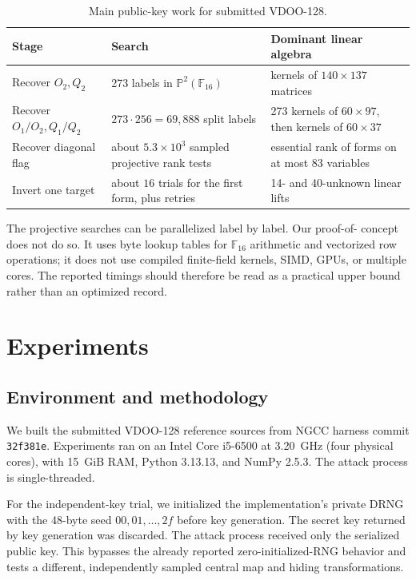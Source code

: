 \documentclass[11pt]{article}
\newcommand{\F}{\mathbb{F}}
\newcommand{\Proj}{\mathbb{P}}
\newcommand{\code}[1]{\texttt{#1}}
\begin{document}
\begin{table}[ht]
\centering
\caption{Main public-key work for submitted VDOO-128.}
\label{tab:work}
\small
\begin{tabular}{@{}p{38mm}p{43mm}p{55mm}@{}}
\toprule
Stage & Search & Dominant linear algebra \\
\midrule
Recover $O_2,Q_2$ & 273 labels in $\Proj^2(\F_{16})$
  & kernels of $140\times137$ matrices \\
Recover $O_1/O_2,Q_1/Q_2$ & $273\cdot256=69{,}888$ split labels
  & 273 kernels of $60\times97$, then kernels of $60\times37$ \\
Recover diagonal flag & about $5.3\times10^3$ sampled projective rank tests
  & essential rank of forms on at most 83 variables \\
Invert one target & about $16$ trials for the first form, plus retries
  & 14- and 40-unknown linear lifts \\
\bottomrule
\end{tabular}
\end{table}

The projective searches can be parallelized label by label.  Our proof-of-
concept does not do so.  It uses byte lookup tables for $\F_{16}$ arithmetic
and vectorized row operations; it does not use compiled finite-field kernels,
SIMD, GPUs, or multiple cores.  The reported timings should therefore be read
as a practical upper bound rather than an optimized record.

\section{Experiments}

\subsection{Environment and methodology}

We built the submitted VDOO-128 reference sources from NGCC harness commit
\code{32f381e}.  Experiments ran on an
Intel Core i5-6500 at 3.20~GHz (four physical cores), with 15~GiB RAM, Python
3.13.13, and NumPy 2.5.3.  The attack process is single-threaded.

For the independent-key trial, we initialized the implementation's private
DRNG with the 48-byte seed $00,01,\ldots,2f$ before key generation.  The secret
key returned by key generation was discarded.  The attack process received
only the serialized public key.  This bypasses the already reported
zero-initialized-RNG behavior and tests a different, independently sampled
central map and hiding transformations.
\end{document}
